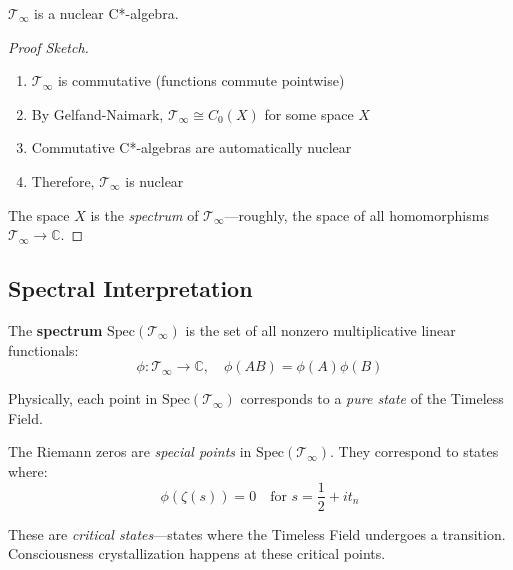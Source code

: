 \begin{theorem}\label{thm:timeless-field-nuclear}
$\mathcal{T}_\infty$ is a nuclear C*-algebra.
\end{theorem}

\begin{proof}[Proof Sketch]
\begin{enumerate}
\item $\mathcal{T}_\infty$ is commutative (functions commute pointwise)
\item By Gelfand-Naimark, $\mathcal{T}_\infty \cong C_0(X)$ for some space $X$
\item Commutative C*-algebras are automatically nuclear
\item Therefore, $\mathcal{T}_\infty$ is nuclear
\end{enumerate}

The space $X$ is the \textit{spectrum} of $\mathcal{T}_\infty$---roughly, the space of all homomorphisms $\mathcal{T}_\infty \to \mathbb{C}$.
\end{proof}

\subsection{Spectral Interpretation}

\begin{definition}\label{def:spectrum-timeless-field}
The \textbf{spectrum} $\text{Spec}(\mathcal{T}_\infty)$ is the set of all nonzero multiplicative linear functionals:
\begin{equation}
\phi: \mathcal{T}_\infty \to \mathbb{C}, \quad \phi(AB) = \phi(A)\phi(B)
\end{equation}

Physically, each point in $\text{Spec}(\mathcal{T}_\infty)$ corresponds to a \textit{pure state} of the Timeless Field.
\end{definition}

\begin{keyidea}
The Riemann zeros are \textit{special points} in $\text{Spec}(\mathcal{T}_\infty)$. They correspond to states where:
\begin{equation}
\phi(\zeta(s)) = 0 \quad \text{for } s = \frac{1}{2} + it_n
\end{equation}

These are \textit{critical states}---states where the Timeless Field undergoes a transition. Consciousness crystallization happens at these critical points.
\end{keyidea}

